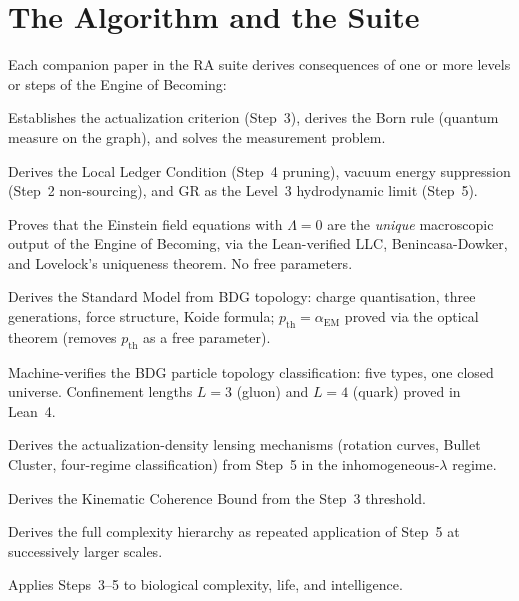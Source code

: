 \documentclass[11pt,a4paper]{article}
\theoremstyle{plain}
\theoremstyle{definition}
\theoremstyle{remark}
\begin{document}
\section{The Algorithm and the Suite}
\label{sec:suite}

Each companion paper in the RA suite derives consequences of one or more
levels or steps of the Engine of Becoming:

\begin{description}[leftmargin=1.5em]
  \item[\textbf{RAQM}~\citep{Sandeman2026a}] Establishes the actualization
  criterion (Step~3), derives the Born rule (quantum measure on the graph),
  and solves the measurement problem.
  \item[\textbf{RAGC}~\citep{Sandeman2026b}] Derives the Local Ledger
  Condition (Step~4 pruning), vacuum energy suppression (Step~2 non-sourcing),
  and GR as the Level~3 hydrodynamic limit (Step~5).
  \item[\textbf{RACL}~\citep{Sandeman2026RACL}] Proves that the Einstein field
  equations with $\Lambda=0$ are the \emph{unique} macroscopic output of the
  Engine of Becoming, via the Lean-verified LLC, Benincasa-Dowker, and
  Lovelock's uniqueness theorem. No free parameters.
  \item[\textbf{RASM}~\citep{Sandeman2026RASM}] Derives the Standard Model
  from BDG topology: charge quantisation, three generations, force structure,
  Koide formula; $p_{\mathrm{th}} = \alpha_{\mathrm{EM}}$ proved via the
  optical theorem (removes $p_{\mathrm{th}}$ as a free parameter).
  \item[\textbf{RATM}~\citep{Sandeman2026RATM}] Machine-verifies the BDG
  particle topology classification: five types, one closed universe.
  Confinement lengths $L{=}3$ (gluon) and $L{=}4$ (quark) proved in Lean~4.
  \item[\textbf{RADM}~\citep{Sandeman2026RADM}] Derives the actualization-density lensing mechanisms (rotation curves, Bullet Cluster, four-regime classification)
  from Step~5 in the inhomogeneous-$\lambda$ regime.
  \item[\textbf{RAQI}~\citep{Sandeman2026d}] Derives the Kinematic Coherence
  Bound from the Step~3 threshold.
  \item[\textbf{RAHC}~\citep{Sandeman2026RAHC}] Derives the full complexity
  hierarchy as repeated application of Step~5 at successively larger scales.
  \item[\textbf{RACI}~\citep{Sandeman2026c}] Applies Steps~3--5 to biological
  complexity, life, and intelligence.
\end{description}
\end{document}
